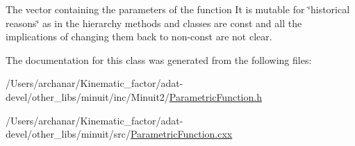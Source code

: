 The vector containing the parameters of the function It is mutable for \char`\"{}historical reasons\char`\"{} as in the hierarchy methods and classes are const and all the implications of changing them back to non-\/const are not clear. 

The documentation for this class was generated from the following files\+:\begin{DoxyCompactItemize}
\item 
/\+Users/archanar/\+Kinematic\+\_\+factor/adat-\/devel/other\+\_\+libs/minuit/inc/\+Minuit2/\mbox{\hyperlink{adat-devel_2other__libs_2minuit_2inc_2Minuit2_2ParametricFunction_8h}{Parametric\+Function.\+h}}\item 
/\+Users/archanar/\+Kinematic\+\_\+factor/adat-\/devel/other\+\_\+libs/minuit/src/\mbox{\hyperlink{adat-devel_2other__libs_2minuit_2src_2ParametricFunction_8cxx}{Parametric\+Function.\+cxx}}\end{DoxyCompactItemize}
